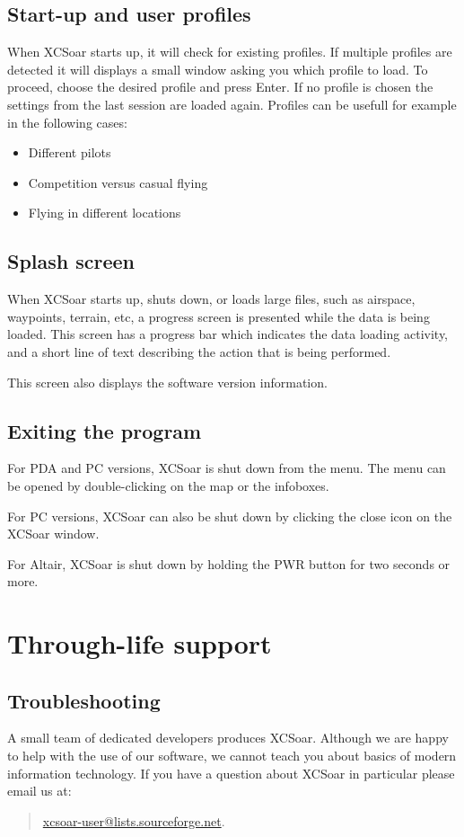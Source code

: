 \documentclass[a4paper,12pt]{refrep}
\begin{document}
\subsection*{Start-up and user profiles}
When XCSoar starts up, it will check for existing profiles. If multiple
profiles are detected it will displays a small window asking you which profile
to load. To proceed, choose the desired profile and press Enter. If no
profile is chosen the settings from the last session are loaded again. Profiles
can be usefull for example in the following cases:
\begin{itemize}
\item Different pilots
\item Competition versus casual flying
\item Flying in different locations
\end{itemize}


\subsection*{Splash screen}
When XCSoar starts up, shuts down, or loads large files, such as airspace,
waypoints, terrain, etc, a progress screen is presented while the data is being
loaded. This screen has a progress bar which indicates the data loading
activity, and a short line of text describing the action that is being performed.

This screen also displays the software version information.

\subsection*{Exiting the program}
For PDA and PC versions, XCSoar is shut down from the menu. The menu can be
opened by double-clicking on the map or the infoboxes.
\begin{quote}
\end{quote}

For PC versions, XCSoar can also be shut down by clicking the close icon
on the XCSoar window.

For Altair, XCSoar is shut down by holding the PWR button for two seconds or
more.

\section{Through-life support}

\subsection*{Troubleshooting}
A small team of dedicated developers produces XCSoar. Although we are
happy to help with the use of our software, we cannot teach you about
basics of modern information technology. If you have a question about XCSoar in
particular please email us at: 
\begin{quote}
\url{xcsoar-user@lists.sourceforge.net}.
\end{quote}
\end{document}
